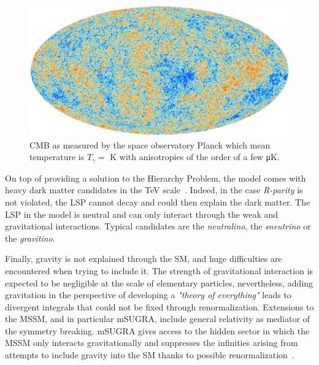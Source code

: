 	\begin{figure}[H]
		\centering
		\includegraphics[width=\plotwidth]{fig/chapt2/CMB.jpg}
		\caption{\label{fig:CMB} \acl{CMB} as measured by the space observatory Planck which mean temperature is $T_\gamma =$ \si{K} with anisotropies of the order of a few \si{\micro K}.}
	\end{figure}
	
	On top of providing a solution to the Hierarchy Problem, the model comes with heavy dark matter candidates in the \si{TeV} scale~\cite{JUNGMAN1996}. Indeed, in the case \textit{R-parity} is not violated, the \acf{LSP} cannot decay and could then explain the dark matter. The LSP in the model is neutral and can only interact through the weak and gravitational interactions. Typical candidates are the \textit{neutralino}, the \textit{sneutrino} or the \textit{gravitino}.
	
	Finally, gravity is not explained through the SM, and huge difficulties are encountered when trying to include it. The strength of gravitational interaction is expected to be negligible at the scale of elementary particles, nevertheless, adding gravitation in the perspective of developing a \textit{"theory of everything"} leads to divergent integrals that could not be fixed through renormalization. Extensions to the MSSM, and in particular \acf{mSUGRA}, include general relativity as mediator of the symmetry breaking. mSUGRA gives access to the hidden sector in which the MSSM only interacts gravitationally and suppresses the infinities arising from attempts to include gravity into the SM thanks to possible renormalization~\cite{CHAMSEDDINE1982}.
	
